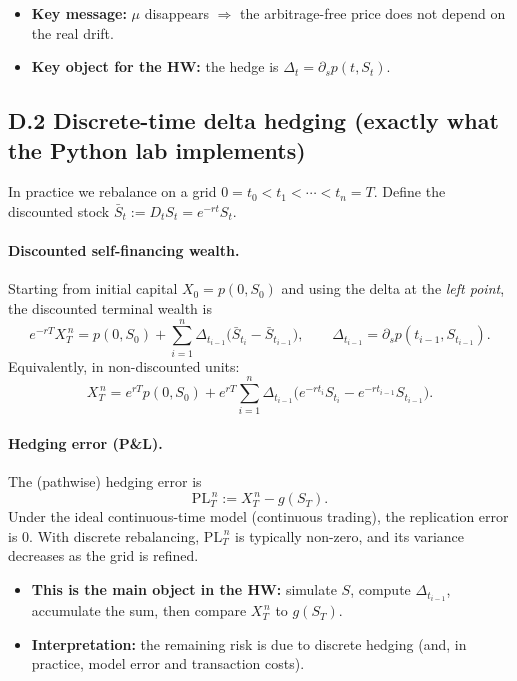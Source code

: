 \documentclass[11pt]{article}
\newcommand{\1}{\mathbf{1}}
\begin{document}
\begin{itemize}[leftmargin=1.4em, itemsep=0.15em]
\item \textbf{Key message:} $\mu$ disappears $\Rightarrow$ the arbitrage-free price does not depend on the real drift.
\item \textbf{Key object for the HW:} the hedge is $\Delta_t=\partial_s p(t,S_t)$.
\end{itemize}

\subsection*{D.2 Discrete-time delta hedging (exactly what the Python lab implements)}

In practice we rebalance on a grid $0=t_0<t_1<\cdots<t_n=T$.
Define the discounted stock $\bar S_t:=D_tS_t=e^{-rt}S_t$.

\paragraph{Discounted self-financing wealth.}
Starting from initial capital $X_0=p(0,S_0)$ and using the delta at the \emph{left point},
the discounted terminal wealth is
\[
e^{-rT}X_T^{\,n}
=
p(0,S_0)
+
\sum_{i=1}^{n}\Delta_{t_{i-1}}\Big(\bar S_{t_i}-\bar S_{t_{i-1}}\Big),
\qquad
\Delta_{t_{i-1}}=\partial_s p(t_{i-1},S_{t_{i-1}}).
\]
Equivalently, in non-discounted units:
\[
X_T^{\,n}
=
e^{rT}p(0,S_0)
+
e^{rT}\sum_{i=1}^{n}\Delta_{t_{i-1}}\Big(e^{-rt_i}S_{t_i}-e^{-rt_{i-1}}S_{t_{i-1}}\Big).
\]

\paragraph{Hedging error (P\&L).}
The (pathwise) hedging error is
\[
\mathrm{PL}_T^{\,n}:=X_T^{\,n}-g(S_T).
\]
Under the ideal continuous-time model (continuous trading), the replication error is $0$.
With discrete rebalancing, $\mathrm{PL}_T^{\,n}$ is typically non-zero, and its variance decreases as the grid is refined.

\begin{itemize}[leftmargin=1.4em, itemsep=0.15em]
\item \textbf{This is the main object in the HW:} simulate $S$, compute $\Delta_{t_{i-1}}$, accumulate the sum,
then compare $X_T^{\,n}$ to $g(S_T)$.
\item \textbf{Interpretation:} the remaining risk is due to discrete hedging (and, in practice, model error and transaction costs).
\end{itemize}
\end{document}
